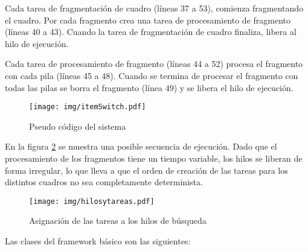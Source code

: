 Cada tarea de fragmentación de cuadro (líneas 37 a 53), comienza fragmentando el
cuadro. Por cada fragmento crea una tarea de procesamiento de fragmento (líneas
40 a 43). Cuando la tarea de fragmentación de cuadro finaliza, libera al hilo de
ejecución.

Cada tarea de procesamiento de fragmento (líneas 44 a 52) procesa el fragmento
con cada pila (líneas 45 a 48). Cuando se termina de procesar el fragmento con
todas las pilas se borra el fragmento (línea 49) y se libera el hilo de
ejecución.

\begin{figure}[!htb]

	\centering

	\texttt{[image: img/itemSwitch.pdf]}

	\caption{Pseudo código del sistema}

	\label{codigo}

\end{figure}

En la figura \ref{hilosytareas} se muestra una posible secuencia de ejecución.
Dado que el procesamiento de los fragmentos tiene un tiempo variable, los hilos
se liberan de forma irregular, lo que lleva a que el orden de creación de las
tareas para los distintos cuadros no sea completamente determinista.

\begin{figure}[!htb]

	\texttt{[image: img/hilosytareas.pdf]}

	\caption{Asignación de las tareas a los hilos de búsqueda}

	\label{hilosytareas}

\end{figure}

Las clases del framework básico son las siguientes:

